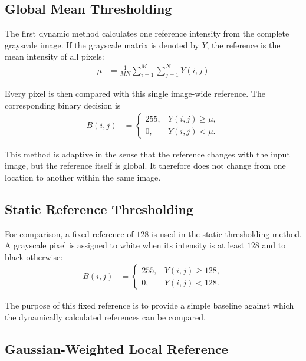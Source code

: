 \subsection{Global Mean Thresholding}

The first dynamic method calculates one reference intensity from the
complete grayscale image. If the grayscale matrix is denoted by $Y$,
the reference is the mean intensity of all pixels:
\begin{align}
\mu &= \frac{1}{MN}\sum_{i=1}^{M}\sum_{j=1}^{N}Y(i,j)\label{eq:global_mean}
\end{align}

Every pixel is then compared with this single image-wide reference. The
corresponding binary decision is
\begin{align}
B(i,j)&=
\begin{cases}
255, & Y(i,j)\geq\mu,\\
0, & Y(i,j)<\mu.
\end{cases}\label{eq:global_mean_threshold}
\end{align}

This method is adaptive in the sense that the reference changes with the
input image, but the reference itself is global. It therefore does not
change from one location to another within the same image.
\vspace*{\baselineskip}
\subsection{Static Reference Thresholding}

For comparison, a fixed reference of $128$ is used in the static
thresholding method. A grayscale pixel is assigned to white when its
intensity is at least $128$ and to black otherwise:
\begin{align}
B(i,j)&=
\begin{cases}
255, & Y(i,j)\geq128,\\
0, & Y(i,j)<128.
\end{cases}\label{eq:static_threshold}
\end{align}

The purpose of this fixed reference is to provide a simple baseline
against which the dynamically calculated references can be compared.
\vspace*{\baselineskip}
\subsection{Gaussian-Weighted Local Reference}

